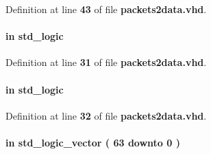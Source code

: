 Definition at line {\bf 43} of file {\bf packets2data.\+vhd}.

\paragraph[{rclk}]{ {\bfseries \textcolor{keywordflow}{in}\textcolor{vhdlchar}{ }} {\bfseries \textcolor{comment}{std\+\_\+logic}\textcolor{vhdlchar}{ }} \hspace{0.3cm}{\ttfamily [Port]}}\label{classpackets2data_adc5af5020d304d578fa740a33045fec7}


Definition at line {\bf 31} of file {\bf packets2data.\+vhd}.

\paragraph[{reset\+\_\+n}]{ {\bfseries \textcolor{keywordflow}{in}\textcolor{vhdlchar}{ }} {\bfseries \textcolor{comment}{std\+\_\+logic}\textcolor{vhdlchar}{ }} \hspace{0.3cm}{\ttfamily [Port]}}\label{classpackets2data_a446ea52ed8c4a84181a47d9165ce41a5}


Definition at line {\bf 32} of file {\bf packets2data.\+vhd}.

\paragraph[{sample\+\_\+nr}]{ {\bfseries \textcolor{keywordflow}{in}\textcolor{vhdlchar}{ }} {\bfseries \textcolor{comment}{std\+\_\+logic\+\_\+vector}\textcolor{vhdlchar}{ }\textcolor{vhdlchar}{(}\textcolor{vhdlchar}{ }\textcolor{vhdlchar}{ } \textcolor{vhdldigit}{63} \textcolor{vhdlchar}{ }\textcolor{keywordflow}{downto}\textcolor{vhdlchar}{ }\textcolor{vhdlchar}{ } \textcolor{vhdldigit}{0} \textcolor{vhdlchar}{ }\textcolor{vhdlchar}{)}\textcolor{vhdlchar}{ }} \hspace{0.3cm}{\ttfamily [Port]}}\label{classpackets2data_a2d4bde289952a99fea4480767d5d30cb}



